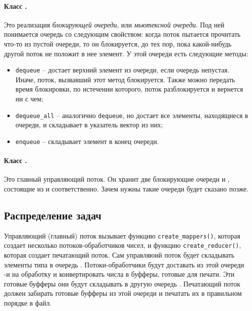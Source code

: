 \documentclass[specialist,subf,href,colorlinks=true,14pt
,times,mtpro,specialist
]{disser}
\begin{document}
\paragraph{Класс \texttt{}.}
Это реализация \textit{блокирующей очереди}, или \textit{мьютексной очереди}.  
Под ней понимается очередь со следующим свойством: когда поток пытается прочитать что-то из пустой очереди, то он блокируется, до тех пор, пока какой-нибудь другой поток не положит в нее элемент.
У этой очереди есть следующие методы:
\begin{itemize}
\item \texttt{dequeue} -- достает верхний элемент из очереди, если очередь непустая.
Иначе, поток, вызвавший этот метод блокируется. Также можно передать время блокировки, по истечении которого, поток разблокируется и вернется ни с чем;
\item \texttt{dequeue\_all} -- аналогично \texttt{dequeue}, но достает все элементы, находящиеся в очереди, и складывает в указатель вектор из них;
\item \texttt{enqueue} -- складывает элемент в конец очереди.
\end{itemize}
\paragraph{Класс \texttt{}.}
Это главный управляющий поток.
Он хранит две блокирующие очереди \texttt{} и \texttt{}, состоящие из \texttt{} и \texttt{} соответственно. 
Зачем нужны такие очереди будет сказано позже.

\subsection{Распределение задач}
Управляющий (главный) поток \texttt{} вызывает функцию \texttt{create\_mappers()}, которая создает несколько потоков-обработчиков чисел, и функцию \texttt{create\_reducer()}, которая создает печатающий поток.
Сам управляюий поток будет складывать элементы типа \texttt{} в очередь \texttt{}.
Потоки-обработчики будут доставать из этой очереди \texttt{}-и на обработку и конвертировать числа в буфферы, готовые для печати.
Эти готовые буфферы \texttt{} они будут складывать в другую очередь \texttt{}.
Печатающий поток должен забирать готовые буфферы из этой очереди и печатать их в правильном порядке в файл.
\end{document}

